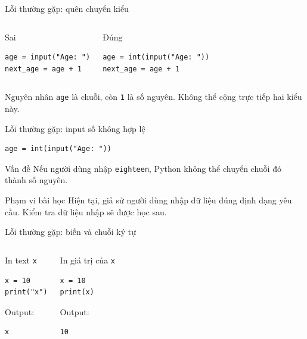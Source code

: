 \documentclass[aspectratio=169,10pt]{beamer}
\begin{document}
\begin{frame}[fragile]{Lỗi thường gặp: quên chuyển kiểu}
\begin{columns}[T,onlytextwidth]
\begin{alertblock}{Sai}
\begin{lstlisting}
age = input("Age: ")
next_age = age + 1
\end{lstlisting}
\end{alertblock}
\begin{exampleblock}{Đúng}
\begin{lstlisting}
age = int(input("Age: "))
next_age = age + 1
\end{lstlisting}
\end{exampleblock}
\end{columns}
\vspace{0.25cm}
\begin{block}{Nguyên nhân}
\texttt{age} là chuỗi, còn \texttt{1} là số nguyên. Không thể cộng trực tiếp hai kiểu này.
\end{block}
\end{frame}

\begin{frame}[fragile]{Lỗi thường gặp: input số không hợp lệ}
\begin{lstlisting}
age = int(input("Age: "))
\end{lstlisting}
\begin{block}{Vấn đề}
Nếu người dùng nhập \texttt{eighteen}, Python không thể chuyển chuỗi đó thành số nguyên.
\end{block}
\begin{alertblock}{Phạm vi bài học}
Hiện tại, giả sử người dùng nhập dữ liệu đúng định dạng yêu cầu. Kiểm tra dữ liệu nhập sẽ được học sau.
\end{alertblock}
\end{frame}

\begin{frame}[fragile]{Lỗi thường gặp: biến và chuỗi ký tự}
\begin{columns}[T,onlytextwidth]
\begin{block}{In text \texttt{x}}
\begin{lstlisting}
x = 10
print("x")
\end{lstlisting}
Output:
\begin{verbatim}
x
\end{verbatim}
\end{block}
\begin{block}{In giá trị của \texttt{x}}
\begin{lstlisting}
x = 10
print(x)
\end{lstlisting}
Output:
\begin{verbatim}
10
\end{verbatim}
\end{block}
\end{columns}
\end{frame}
\end{document}
